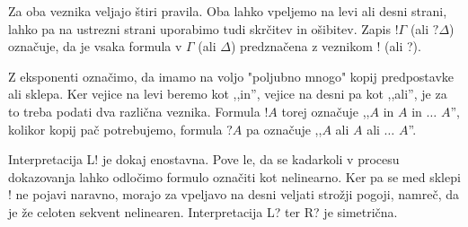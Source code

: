 \begin{definicija}
\begin{center}
        \begin{bprooftree}
        \end{bprooftree}
        \begin{bprooftree}
        \end{bprooftree}
    \end{center}
    Za oba veznika veljajo štiri pravila. Oba lahko vpeljemo na levi ali desni strani, lahko pa na ustrezni strani uporabimo tudi skrčitev in ošibitev. Zapis $!\Gamma$ (ali $?\Delta$) označuje, da je vsaka formula v $\Gamma$ (ali $\Delta$) predznačena z veznikom ! (ali ?).
\end{definicija}

Z eksponenti označimo, da imamo na voljo "poljubno mnogo" kopij predpostavke ali sklepa. Ker vejice na levi beremo kot ,,in'', vejice na desni pa kot ,,ali'', je za to treba podati dva različna veznika. Formula $!A$ torej označuje ,,$A$ in $A$ in $\ldots$ $A$'', kolikor kopij pač potrebujemo, formula $?A$ pa označuje ,,$A$ ali $A$ ali $\ldots$ $A$''.

Interpretacija L! je dokaj enostavna. Pove le, da se kadarkoli v procesu dokazovanja lahko odločimo formulo označiti kot nelinearno. Ker pa se med sklepi ! ne pojavi naravno, morajo za vpeljavo na desni veljati strožji pogoji, namreč, da je že celoten sekvent nelinearen. Interpretacija L? ter R? je simetrična.
